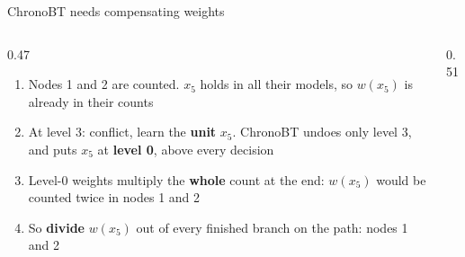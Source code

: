 \documentclass[aspectratio=169]{beamer}
\begin{document}
\begin{frame}{ChronoBT needs compensating weights}
  \begin{columns}[c]
    \begin{column}{0.47\textwidth}
      \small
      \begin{enumerate}
        \item Nodes 1 and 2 are counted. $x_5$ holds in all their models,
          so $w(x_5)$ is already in their counts
        \item At level 3: conflict, learn the \textbf{unit} $x_5$. ChronoBT
          undoes only level 3, and puts $x_5$ at \textbf{level 0}, above every
          decision
        \item Level-0 weights multiply the \textbf{whole} count at the end:
          $w(x_5)$ would be counted twice in nodes 1 and 2
        \item So \textbf{divide} $w(x_5)$ out of every finished branch on the
          path: nodes 1 and 2
      \end{enumerate}
    \end{column}
    \begin{column}{0.51\textwidth}
      \centering
    \end{column}
  \end{columns}
\end{frame}
\end{document}
